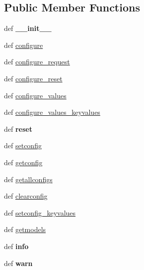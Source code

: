 \subsection*{Public Member Functions}
\begin{DoxyCompactItemize}
\item 
\hypertarget{classcore_1_1conf_1_1_configurable_manager_a199933aed21d63d5a45963dedde363b8}{def {\bfseries \+\_\+\+\_\+init\+\_\+\+\_\+}}\label{classcore_1_1conf_1_1_configurable_manager_a199933aed21d63d5a45963dedde363b8}

\item 
def \hyperlink{classcore_1_1conf_1_1_configurable_manager_a323cd80662589456e92446bc00d3f121}{configure}
\item 
def \hyperlink{classcore_1_1conf_1_1_configurable_manager_a61f4ce61e2e9071044ad9cdb5b62c5d8}{configure\+\_\+request}
\item 
def \hyperlink{classcore_1_1conf_1_1_configurable_manager_a7bf7ec34d9577b402caf567116adadb0}{configure\+\_\+reset}
\item 
def \hyperlink{classcore_1_1conf_1_1_configurable_manager_ada87a29998b14563fe9f1b92a9d5cd5f}{configure\+\_\+values}
\item 
def \hyperlink{classcore_1_1conf_1_1_configurable_manager_ab1de29d30306eabba9805c8f39f1806c}{configure\+\_\+values\+\_\+keyvalues}
\item 
\hypertarget{classcore_1_1conf_1_1_configurable_manager_ab3d219018ffdf814972b79cf613dddc1}{def {\bfseries reset}}\label{classcore_1_1conf_1_1_configurable_manager_ab3d219018ffdf814972b79cf613dddc1}

\item 
def \hyperlink{classcore_1_1conf_1_1_configurable_manager_a4594891c10805361b6c96e6dfbf742da}{setconfig}
\item 
def \hyperlink{classcore_1_1conf_1_1_configurable_manager_a50e76fc0629141783acc1560e8ff8d6b}{getconfig}
\item 
def \hyperlink{classcore_1_1conf_1_1_configurable_manager_a38c5d075bc02ba0d9aa5bd9752f11c16}{getallconfigs}
\item 
def \hyperlink{classcore_1_1conf_1_1_configurable_manager_a8cc2f85aaad6cc0c9f04469c3554d320}{clearconfig}
\item 
def \hyperlink{classcore_1_1conf_1_1_configurable_manager_adb9d5645b6551d5928392cacfe116961}{setconfig\+\_\+keyvalues}
\item 
def \hyperlink{classcore_1_1conf_1_1_configurable_manager_aa37e907c84352572c5d080f2b27385d5}{getmodels}
\item 
\hypertarget{classcore_1_1conf_1_1_configurable_manager_a914e3d2cd2ca6c4ad0eaa149505bb38f}{def {\bfseries info}}\label{classcore_1_1conf_1_1_configurable_manager_a914e3d2cd2ca6c4ad0eaa149505bb38f}

\item 
\hypertarget{classcore_1_1conf_1_1_configurable_manager_ad815521e7aa4379a19c5973ce2cc58cb}{def {\bfseries warn}}\label{classcore_1_1conf_1_1_configurable_manager_ad815521e7aa4379a19c5973ce2cc58cb}

\end{DoxyCompactItemize}
